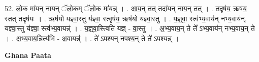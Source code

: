 \documentclass[17pt]{extarticle}
\begin{document}
52. लो॒क मा॑यन् नायन् ॅलो॒कम् ॅलो॒क मा॑यन्न् । . आ॒य॒न् तत् तदा॑यन् नाय॒न् तत् । . तदृष॑य॒ ऋष॑य॒ स्तत् तदृष॑यः । . ऋष॑यो यज्ञ्वा॒स्तु य॑ज्ञ्वा॒ स्त्वृष॑य॒ ऋष॑यो यज्ञ्वा॒स्तु । . य॒ज्ञ्॒वा॒ स्त्व॑भ्य॒वाय॑न् नभ्य॒वाय॑न्. यज्ञ्वा॒स्तु य॑ज्ञ्वा॒ स्त्व॑भ्य॒वायन्न्॑ । . य॒ज्ञ्॒वा॒स्त्विति॑ यज्ञ् - वा॒स्तु । . अ॒भ्य॒वाय॒न् ते ते᳚ ऽभ्य॒वाय॑न् नभ्य॒वाय॒न् ते । . अ॒भ्य॒वाय॒न्नित्य॑भि - अ॒वायन्न्॑ । . ते॑ ऽपश्यन् नपश्य॒न् ते ते॑ ऽपश्यन्न् । \newline

\textbf{Ghana Paata } \newline
\end{document}
